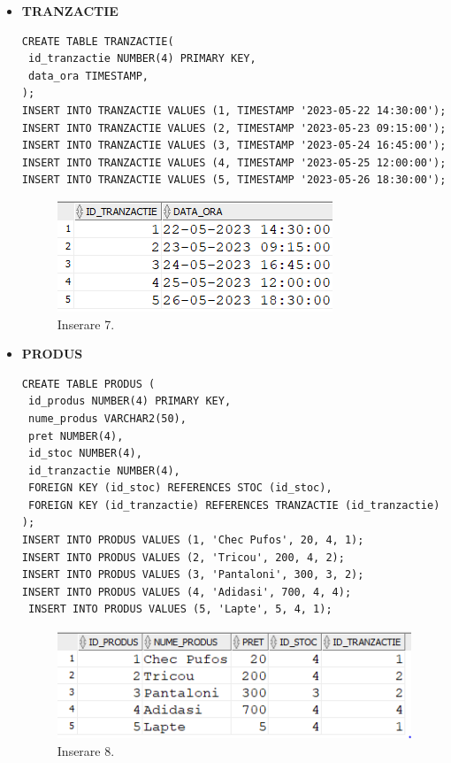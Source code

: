 \begin{itemize}
    \item \textbf{TRANZACTIE}
    \vspace{0.2cm}
    \begin{lstlisting}
CREATE TABLE TRANZACTIE(
 id_tranzactie NUMBER(4) PRIMARY KEY,
 data_ora TIMESTAMP,
);
INSERT INTO TRANZACTIE VALUES (1, TIMESTAMP '2023-05-22 14:30:00');
INSERT INTO TRANZACTIE VALUES (2, TIMESTAMP '2023-05-23 09:15:00');
INSERT INTO TRANZACTIE VALUES (3, TIMESTAMP '2023-05-24 16:45:00');
INSERT INTO TRANZACTIE VALUES (4, TIMESTAMP '2023-05-25 12:00:00');
INSERT INTO TRANZACTIE VALUES (5, TIMESTAMP '2023-05-26 18:30:00');
    \end{lstlisting}
    \vspace{0.2cm}
    \begin{figure}[h]
      \centerline{\includegraphics{images/inserare7.png}}
      \caption{ Inserare 7.}
    \end{figure}
    \vspace{0.5cm}

    \item \textbf{PRODUS}
    \vspace{0.2cm}
    \begin{lstlisting}
CREATE TABLE PRODUS (
 id_produs NUMBER(4) PRIMARY KEY,
 nume_produs VARCHAR2(50),
 pret NUMBER(4),
 id_stoc NUMBER(4),
 id_tranzactie NUMBER(4),
 FOREIGN KEY (id_stoc) REFERENCES STOC (id_stoc),
 FOREIGN KEY (id_tranzactie) REFERENCES TRANZACTIE (id_tranzactie)
);
INSERT INTO PRODUS VALUES (1, 'Chec Pufos', 20, 4, 1);
INSERT INTO PRODUS VALUES (2, 'Tricou', 200, 4, 2);
INSERT INTO PRODUS VALUES (3, 'Pantaloni', 300, 3, 2);
INSERT INTO PRODUS VALUES (4, 'Adidasi', 700, 4, 4);
 INSERT INTO PRODUS VALUES (5, 'Lapte', 5, 4, 1);
    \end{lstlisting}
    \vspace{0.2cm}
    \begin{figure}[h]
      \centerline{\includegraphics{images/inserare8.png}}
      \caption{ Inserare 8.}
    \end{figure}
    \vspace{0.5cm}


\end{itemize}

